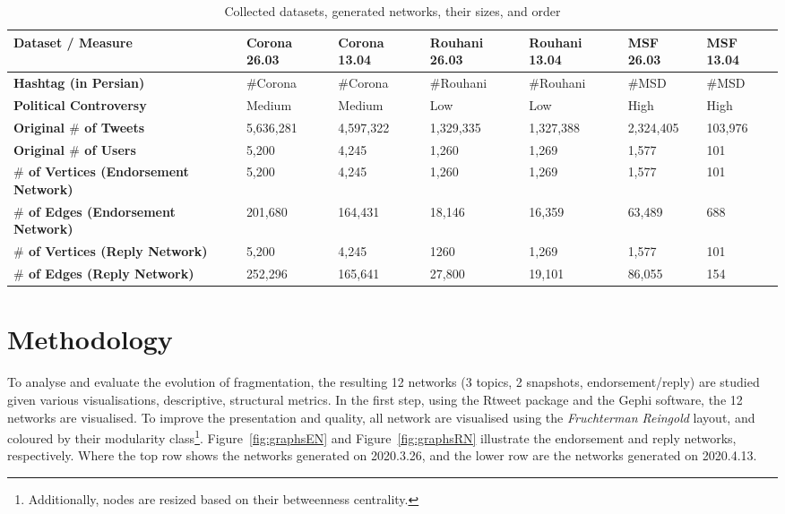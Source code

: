 \documentclass[journal,11pt]{IEEEtran}
\begin{document}
\begin{table}[!htb]
\centering
\caption{Collected datasets, generated networks, their sizes, and order}
\scriptsize
\begin{tabular}{lllllll}
\toprule
\textbf{Dataset / Measure} & \textbf{Corona 26.03} & \textbf{Corona 13.04} & \textbf{Rouhani 26.03} & \textbf{Rouhani 13.04} &\textbf{MSF 26.03} & \textbf{MSF 13.04} \\
\midrule
\textbf{Hashtag (in Persian)} & \#Corona & \#Corona & \#Rouhani & \#Rouhani & \#MSD & \#MSD  \\
\addlinespace
\textbf{Political Controversy} & Medium & Medium & Low & Low & High & High \\
\addlinespace
\textbf{Original $\#$ of Tweets} & 5,636,281 & 4,597,322 & 1,329,335 & 1,327,388 & 2,324,405 & 103,976\\
\addlinespace
\textbf{Original $\#$ of Users} & 5,200  & 4,245 & 1,260 & 1,269 & 1,577 & 101 \\
\addlinespace
\textbf{$\#$ of Vertices (Endorsement Network)} & 5,200  & 4,245 & 1,260 & 1,269 & 1,577 & 101\\
\addlinespace
\textbf{$\#$ of Edges (Endorsement Network)} &  201,680 & 164,431 & 18,146 & 16,359 & 63,489 & 688\\
\addlinespace
\textbf{$\#$ of Vertices (Reply Network)} & 5,200  & 4,245 & 1260 & 1,269 & 1,577 & 101 \\
\addlinespace
\textbf{$\#$ of Edges (Reply Network)} & 252,296  & 165,641 & 27,800 & 19,101 & 86,055 & 154\\
\bottomrule
\end{tabular}
\label{T:datasets}
\end{table}
\section{Methodology}
\label{S:Method}
To analyse and evaluate the evolution of fragmentation, the resulting 12 networks (3 topics, 2 snapshots, endorsement/reply) are studied given various visualisations, descriptive, structural metrics. In the first step, using the Rtweet package and the Gephi software, the 12 networks are visualised. To improve the presentation and quality, all network are visualised using the \textit{Fruchterman Reingold} layout, and coloured by their modularity class\footnote{Additionally, nodes are resized based on their betweenness centrality.}. Figure~\ref{fig:graphsEN} and Figure~\ref{fig:graphsRN} illustrate the endorsement and reply networks, respectively. Where the top row shows the networks generated on 2020.3.26, and the lower row are the networks generated on 2020.4.13. \\
\end{document}
